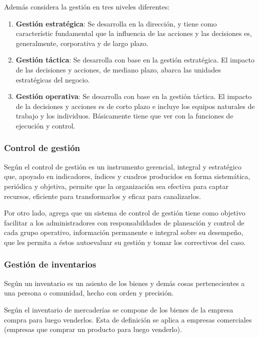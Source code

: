 Adem\'as \cite{beltran} considera la gesti\'on en tres niveles diferentes:
\begin{enumerate}
    \item \textbf{Gesti\'on estrat\'egica}: Se desarrolla en la direcci\'on, y tiene como
          caracter\'istic fundamental que la influencia de las acciones y las decisiones
          es, generalmente, corporativa y de largo plazo.
    \item \textbf{Gesti\'on t\'actica}: Se desarrolla con base en la gesti\'on
          estrat\'egica. El impacto de las decisiones y acciones, de mediano plazo,
          abarca las unidades estrat\'egicas del negocio.
    \item \textbf{Gesti\'on operativa}: Se desarrolla con base en la gesti\'on
          t\'actica. El impacto de la decisiones y acciones es de corto plazo e incluye
          los equipos naturales de trabajo y los individuos. B\'asicamente tiene
          que ver con la funciones de ejecuci\'on y control.
\end{enumerate}

\subsubsection{Control de gesti\'on}
Seg\'un \cite{beltran} el control de gesti\'on es un instrumento gerencial, integral
y estrat\'egico que, apoyado en indicadores, \'indices y cuadros producidos en forma
sistem\'atica, peri\'odica y objetiva, permite que la organizaci\'on sea efectiva para
captar recursos, eficiente para transformarlos y eficaz para canalizarlos.

Por otro lado, \cite{beltran} agrega que un sistema de control de gesti\'on tiene
como objetivo facilitar a los administradores con responsabildades de planeaci\'on
y control de cada grupo operativo, informaci\'on permanente e integral sobre su desempe\~no,
que les permita a \'estos autoevaluar su gesti\'on y tomar los correctivos del caso.



\subsubsection{Gesti\'on de inventarios}
Seg\'un \cite{rae} un inventario es un asiento de los bienes y dem\'as cosas
pertenecientes a una persona o comunidad, hecho con orden y precisi\'on.

Seg\'un \cite{meza} el inventario de mercader\'ias se compone de los bienes de la
empresa compra para luego venderlos. Esta de definici\'on se aplica a empresas
comerciales (empresas que comprar un producto para luego venderlo).


